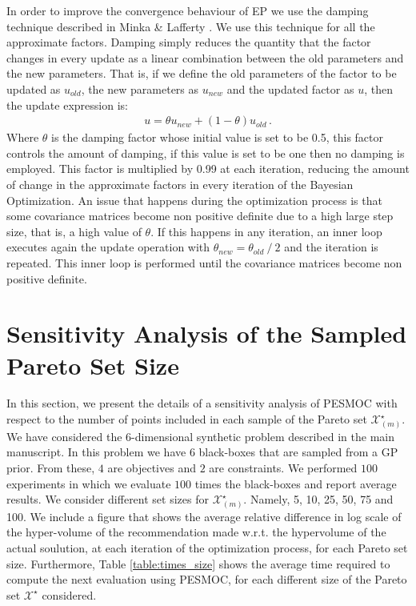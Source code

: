 In order to improve the convergence behaviour of EP we use the damping technique described in Minka \& Lafferty \citep{gelman2014expectation}. We use this technique for all the approximate factors. Damping simply reduces the quantity that the factor changes in every update as a linear combination between the old parameters and the new parameters. That is, if we define the old parameters of the factor to be updated as $u_{old}$, the new parameters as $u_{new}$ and the updated factor as $u$, then the update expression is:
\begin{align}
    u = \theta u_{new} + (1-\theta)u_{old}\,.
\end{align}
Where $\theta$ is the damping factor whose initial value is set to be 0.5, this factor controls the amount of damping, if this value is set to be one then no damping is employed. This factor is multiplied by 0.99 at each iteration, reducing the amount of change in the approximate factors in every iteration of the Bayesian Optimization. An issue that happens during the optimization process is that some covariance matrices become non positive definite due to a high large step size, that is, a high value of $\theta$. If this happens in any iteration, an inner loop executes again the update operation with $\theta_{new} = \theta_{old}\ /\ 2$ and the iteration is repeated. This inner loop is performed until the covariance matrices become non positive definite.

\section{Sensitivity Analysis of the Sampled Pareto Set Size}

In this section, we present the details of a sensitivity analysis of PESMOC with respect to the number of points included in
each sample of the Pareto set $\mathcal{X}_{(m)}^\star$. We have considered the 6-dimensional synthetic problem described in
the main manuscript.  In this problem we have $6$ black-boxes that are sampled from a GP prior. From these, $4$ are objectives
and $2$ are constraints. We performed $100$ experiments in which we evaluate $100$ times the black-boxes and report average
results. We consider different set sizes for $\mathcal{X}_{(m)}^\star$. Namely, 5, 10, 25, 50, 75 and 100. We include a figure that
shows the average relative difference in log scale of the hyper-volume of the recommendation made w.r.t. the hypervolume of the
actual soulution, at each iteration of the optimization process, for each Pareto set size. Furthermore, Table \ref{table:times_size}
shows the average time required to compute the next evaluation using PESMOC, for each different size of the Pareto set
$\mathcal{X}^\star$ considered.

